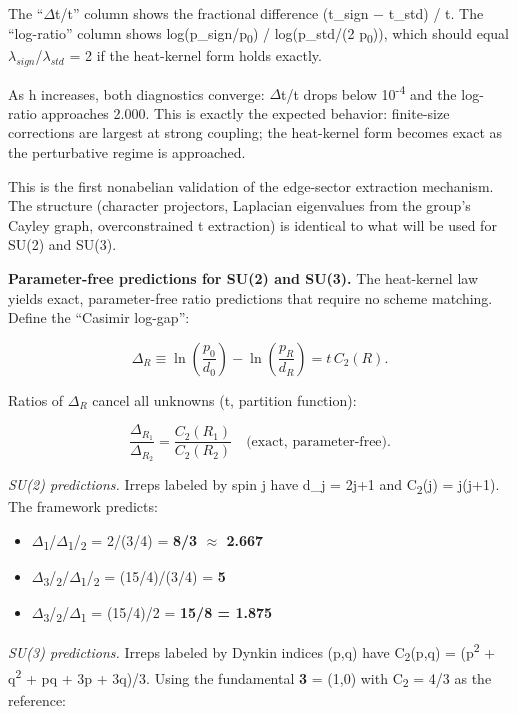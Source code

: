 \documentclass[11pt,a4paper]{article}
\theoremstyle{remark}
\providecommand{\tightlist}{%
  \setlength{\itemsep}{0pt}\setlength{\parskip}{0pt}}
\begin{document}
The ``\ensuremath{\Delta}t/t'' column shows the fractional difference (t\_sign \ensuremath{-}
t\_std) / t. The ``log-ratio'' column shows
log(p\_sign/p\textsubscript{0}) / log(p\_std/(2 p\textsubscript{0})), which should
equal $\lambda_{sign}$/$\lambda_{std}$ = 2 if the heat-kernel
form holds exactly.

As h increases, both diagnostics converge: \ensuremath{\Delta}t/t drops below 10\textsuperscript{-4}
and the log-ratio approaches 2.000. This is exactly the expected behavior:
finite-size corrections are largest at strong coupling; the heat-kernel form
becomes exact as the perturbative regime is approached.

This is the first nonabelian validation of the edge-sector extraction mechanism.
The structure (character projectors, Laplacian eigenvalues from the group's
Cayley graph, overconstrained t extraction) is identical to what will be used
for SU(2) and SU(3).

\textbf{Parameter-free predictions for SU(2) and SU(3).} The heat-kernel law yields
exact, parameter-free ratio predictions that require no scheme matching. Define
the ``Casimir log-gap'':

\[
\Delta_R \equiv \ln\left(\frac{p_0}{d_0}\right) - \ln\left(\frac{p_R}{d_R}\right)
= t \, C_2(R).
\]

Ratios of $\Delta_R$ cancel all unknowns (t, partition function):

\[
\frac{\Delta_{R_1}}{\Delta_{R_2}} = \frac{C_2(R_1)}{C_2(R_2)}
\quad \text{(exact, parameter-free).}
\]

\emph{SU(2) predictions.} Irreps labeled by spin j have d\_j = 2j+1 and
C\textsubscript{2}(j) = j(j+1). The framework predicts:

\begin{itemize}
\tightlist
\item
  \ensuremath{\Delta}\textsubscript{1}/\ensuremath{\Delta}\textsubscript{1}/\textsubscript{2} = 2/(3/4) = \textbf{8/3 \ensuremath{\approx} 2.667}
\item
  \ensuremath{\Delta}\textsubscript{3}/\textsubscript{2}/\ensuremath{\Delta}\textsubscript{1}/\textsubscript{2} = (15/4)/(3/4) = \textbf{5}
\item
  \ensuremath{\Delta}\textsubscript{3}/\textsubscript{2}/\ensuremath{\Delta}\textsubscript{1} = (15/4)/2 = \textbf{15/8 = 1.875}
\end{itemize}

\emph{SU(3) predictions.} Irreps labeled by Dynkin indices (p,q) have
C\textsubscript{2}(p,q) = (p\textsuperscript{2} + q\textsuperscript{2} + pq + 3p + 3q)/3. Using the fundamental \textbf{3} = (1,0)
with C\textsubscript{2} = 4/3 as the reference:
\end{document}
